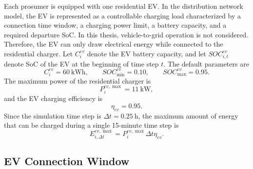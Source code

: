 Each prosumer is equipped with one residential EV. In the distribution network model, the EV is represented as a controllable charging load characterized by a connection time window, a charging power limit, a battery capacity, and a required departure SoC. In this thesis, vehicle-to-grid operation is not considered. Therefore, the EV can only draw electrical energy while connected to the residential charger. Let \(C^{ev}_i\) denote the EV battery capacity, and let \(SOC^{ev}_{i,t}\) denote SoC of the EV at the beginning of time step \(t\). The default parameters are
\[
  C^{ev}_i=60\ \mathrm{kWh}, \qquad
  SOC^{ev}_{\min}=0.10, \qquad
  SOC^{ev}_{\max}=0.95.
\]
The maximum power of the residential charger is
\[
  P^{ev,\max}_i=11\ \mathrm{kW},
\]
and the EV charging efficiency is
\[
  \eta_{ev}=0.95.
\]
Since the simulation time step is \(\Delta t=0.25\ \mathrm{h}\), the maximum amount of energy that can be charged during a single 15-minute time step is
\[
  E^{ev,\max}_{i,\Delta t}
  =
  P^{ev,\max}_i\Delta t\eta_{ev}.
\]

\subsection{EV Connection Window}

